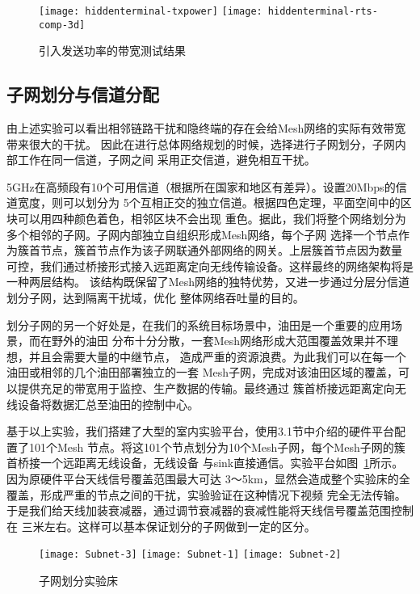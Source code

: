 \begin{figure}[h]
  \centering
      {\texttt{[image: hiddenterminal-txpower]}}
  \hspace{1em}
    {\texttt{[image: hiddenterminal-rts-comp-3d]}}
  \caption{引入发送功率的带宽测试结果}
\end{figure}

\subsection{子网划分与信道分配}
由上述实验可以看出相邻链路干扰和隐终端的存在会给Mesh网络的实际有效带宽带来很大的干扰。
因此在进行总体网络规划的时候，选择进行子网划分，子网内部工作在同一信道，子网之间
采用正交信道，避免相互干扰。

5GHz在高频段有10个可用信道（根据所在国家和地区有差异）。设置20Mbps的信道宽度，则可以划分为
5个互相正交的独立信道。根据四色定理，平面空间中的区块可以用四种颜色着色，相邻区块不会出现
重色。据此，我们将整个网络划分为多个相邻的子网。子网内部独立自组织形成Mesh网络，每个子网
选择一个节点作为簇首节点，簇首节点作为该子网联通外部网络的网关。上层簇首节点因为数量
可控，我们通过桥接形式接入远距离定向无线传输设备。这样最终的网络架构将是一种两层结构。
该结构既保留了Mesh网络的独特优势，又进一步通过分层分信道划分子网，达到隔离干扰域，优化
整体网络吞吐量的目的。

划分子网的另一个好处是，在我们的系统目标场景中，油田是一个重要的应用场景，而在野外的油田
分布十分分散，一套Mesh网络形成大范围覆盖效果并不理想，并且会需要大量的中继节点，
造成严重的资源浪费。为此我们可以在每一个油田或相邻的几个油田部署独立的一套
Mesh子网，完成对该油田区域的覆盖，可以提供充足的带宽用于监控、生产数据的传输。最终通过
簇首桥接远距离定向无线设备将数据汇总至油田的控制中心。

基于以上实验，我们搭建了大型的室内实验平台，使用3.1节中介绍的硬件平台配置了101个Mesh
节点。将这101个节点划分为10个Mesh子网，每个Mesh子网的簇首桥接一个远距离无线设备，无线设备
与sink直接通信。实验平台如图~\ref{fig:subnet}所示。因为原硬件平台天线信号覆盖范围最大可达
3～5km，显然会造成整个实验床的全覆盖，形成严重的节点之间的干扰，实验验证在这种情况下视频
完全无法传输。于是我们给天线加装衰减器，通过调节衰减器的衰减性能将天线信号覆盖范围控制在
三米左右。这样可以基本保证划分的子网做到一定的区分。

\begin{figure}[h]
  \centering
  \subcaptionbox{}
      {\texttt{[image: Subnet-3]}}
  \hspace{1em}
  \subcaptionbox{}
    {\texttt{[image: Subnet-1]}}
  \hspace{1em}
  \subcaptionbox{}
    {\texttt{[image: Subnet-2]}}
  \caption{子网划分实验床}
  \label{fig:subnet}
\end{figure}

